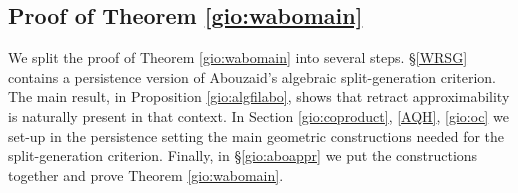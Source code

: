

\subsection{Proof of Theorem \ref{gio:wabomain}}\label{gio:proofwabomain}
We split the proof of Theorem \ref{gio:wabomain} into several steps. \S\ref{WRSG} contains a persistence version of Abouzaid's algebraic split-generation criterion. The main result, in Proposition \ref{gio:algfilabo}, shows that retract approximability 
is naturally present in that context.
 In Section \ref{gio:coproduct}, \ref {AQH}, \ref{gio:oc} we set-up in the persistence setting the main geometric constructions needed for the split-generation criterion. 
Finally, in \S\ref{gio:aboappr} we put the constructions together and prove Theorem \ref{gio:wabomain}.

